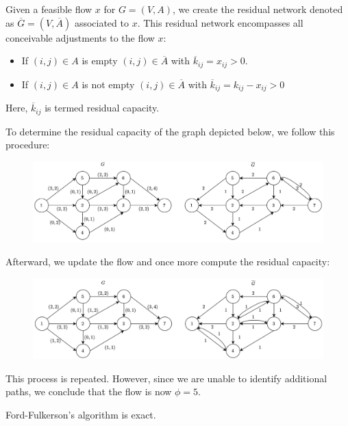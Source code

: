 Given a feasible flow $x$ for $G=(V,A)$, we create the residual network denoted as $\overline{G}=(V,\overline{A})$ associated to $x$. 
This residual network encompasses all conceivable adjustments to the flow $x$: 
\begin{itemize}
    \item If $(i,j) \in A$ is empty $(i,j) \in \overline{A}$ with $\overline{k}_{ij}=x_{ij}>0$.
    \item If $(i,j) \in A$ is not empty $(i,j) \in \overline{A}$ with $\overline{k}_{ij}=k_{ij}-x_{ij}>0$
\end{itemize}
Here, $\overline{k}_{ij}$ is termed residual capacity. 
\begin{example}
    To determine the residual capacity of the graph depicted below, we follow this procedure:
    \begin{figure}[H]
        \centering
        \includegraphics[width=0.75\linewidth]{images/residual1.png}
    \end{figure}
    Afterward, we update the flow and once more compute the residual capacity:
    \begin{figure}[H]
        \centering
        \includegraphics[width=0.75\linewidth]{images/residual2.png}
    \end{figure}
    This process is repeated. 
    However, since we are unable to identify additional paths, we conclude that the flow is now $\phi=5$.
\end{example}
\begin{proposition}
    Ford-Fulkerson's algorithm is exact. 
\end{proposition}
